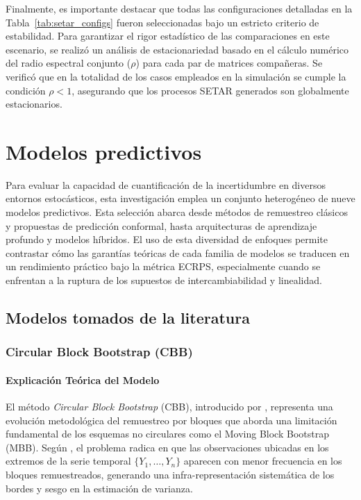 Finalmente, es importante destacar que todas las configuraciones detalladas en la Tabla~\ref{tab:setar_configs} fueron seleccionadas bajo un estricto criterio de estabilidad. Para garantizar el rigor estadístico de las comparaciones en este escenario, se realizó un análisis de estacionariedad basado en el cálculo numérico del radio espectral conjunto ($\rho$) para cada par de matrices compañeras. Se verificó que en la totalidad de los casos empleados en la simulación se cumple la condición $\rho < 1$, asegurando que los procesos SETAR generados son globalmente estacionarios.



\section{Modelos predictivos}
\label{sec:modelos_predictivos}
Para evaluar la capacidad de cuantificación de la incertidumbre en diversos entornos estocásticos, esta investigación emplea un conjunto heterogéneo de nueve modelos predictivos. Esta selección abarca desde métodos de remuestreo clásicos y propuestas de predicción conformal, hasta arquitecturas de aprendizaje profundo y modelos híbridos. El uso de esta diversidad de enfoques permite contrastar cómo las garantías teóricas de cada familia de modelos se traducen en un rendimiento práctico bajo la métrica ECRPS, especialmente cuando se enfrentan a la ruptura de los supuestos de intercambiabilidad y linealidad.

\subsection{Modelos tomados de la literatura}

\subsubsection{Circular Block Bootstrap (CBB)}
\label{subsec:CCB}
\paragraph{Explicación Teórica del Modelo}

El método \textit{Circular Block Bootstrap} (CBB), introducido por \textcite{politis1992circular}, representa una evolución metodológica del remuestreo por bloques que aborda una limitación fundamental de los esquemas no circulares como el Moving Block Bootstrap (MBB). Según \textcite{Lahiri2003}, el problema radica en que las observaciones ubicadas en los extremos de la serie temporal $\{Y_1, \dots, Y_n\}$ aparecen con menor frecuencia en los bloques remuestreados, generando una infra-representación sistemática de los bordes y sesgo en la estimación de varianza.

